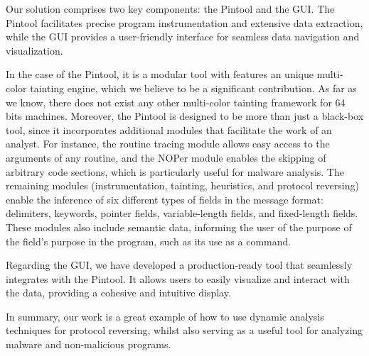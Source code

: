 \documentclass[conference]{IEEEtran}
\begin{document}
Our solution comprises two key components: the Pintool and the GUI. The Pintool facilitates precise program instrumentation and extensive 
data extraction, while the GUI provides a user-friendly interface for seamless data navigation and visualization.

In the case of the Pintool, it is a modular tool with features an unique multi-color tainting engine, which we believe
to be a significant contribution. As far as we know, there does not exist any other multi-color
tainting framework for 64 bits machines. Moreover, the Pintool is designed to be more than just a black-box tool, since
it incorporates additional modules that facilitate the work of an analyst. For instance, the routine tracing module 
allows easy access to the arguments of any routine, and the NOPer module enables the skipping of arbitrary code sections, 
which is particularly useful for malware analysis. The remaining modules (instrumentation, tainting, heuristics, and protocol reversing)
enable the inference of six different types of fields in the message format: delimiters, keywords, pointer fields, variable-length fields,
and fixed-length fields. These modules also include semantic data, informing the user of the purpose of the field's purpose in the program, 
such as its use as a command.

Regarding the GUI, we have developed a production-ready tool that seamlessly integrates with the Pintool. 
It allows users to easily visualize and interact with the data, providing a cohesive and intuitive display.

In summary, our work is a great example of how to use dynamic analysis techniques for protocol reversing, whilst
also serving as a useful tool for analyzing malware and non-malicious programs. 
\end{document}
